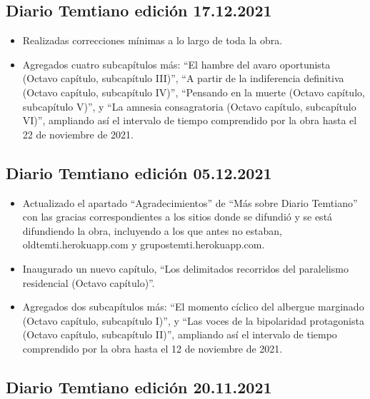 \documentclass[
  spanish,
]{book}
\begin{document}
\hypertarget{diario-temtiano-ediciuxf3n-17.12.2021}{%
\subsection*{Diario Temtiano edición 17.12.2021}\label{diario-temtiano-ediciuxf3n-17.12.2021}}

\begin{itemize}
\item
  Realizadas correcciones mínimas a lo largo de toda la obra.
\item
  Agregados cuatro subcapítulos más: ``El hambre del avaro oportunista (Octavo capítulo, subcapítulo III)'', ``A partir de la indiferencia definitiva (Octavo capítulo, subcapítulo IV)'', ``Pensando en la muerte (Octavo capítulo, subcapítulo V)'', y ``La amnesia consagratoria (Octavo capítulo, subcapítulo VI)'', ampliando así el intervalo de tiempo comprendido por la obra hasta el 22 de noviembre de 2021.
\end{itemize}

\hypertarget{diario-temtiano-ediciuxf3n-05.12.2021}{%
\subsection*{Diario Temtiano edición 05.12.2021}\label{diario-temtiano-ediciuxf3n-05.12.2021}}

\begin{itemize}
\item
  Actualizado el apartado ``Agradecimientos'' de ``Más sobre Diario Temtiano'' con las gracias correspondientes a los sitios donde se difundió y se está difundiendo la obra, incluyendo a los que antes no estaban, oldtemti.herokuapp.com y grupostemti.herokuapp.com.
\item
  Inaugurado un nuevo capítulo, ``Los delimitados recorridos del paralelismo residencial (Octavo capítulo)''.
\item
  Agregados dos subcapítulos más: ``El momento cíclico del albergue marginado (Octavo capítulo, subcapítulo I)'', y ``Las voces de la bipolaridad protagonista (Octavo capítulo, subcapítulo II)'', ampliando así el intervalo de tiempo comprendido por la obra hasta el 12 de noviembre de 2021.
\end{itemize}

\hypertarget{diario-temtiano-ediciuxf3n-20.11.2021}{%
\subsection*{Diario Temtiano edición 20.11.2021}\label{diario-temtiano-ediciuxf3n-20.11.2021}}
\end{document}
